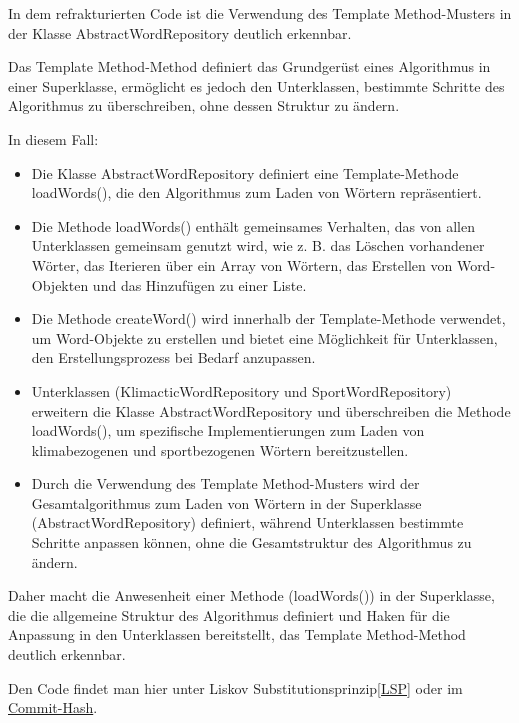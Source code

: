In dem refrakturierten Code ist die Verwendung des Template Method-Musters in der Klasse AbstractWordRepository deutlich erkennbar.

Das Template Method-Method definiert das Grundgerüst eines Algorithmus in einer Superklasse, ermöglicht es jedoch den Unterklassen, bestimmte Schritte des Algorithmus zu überschreiben, ohne dessen Struktur zu ändern.

In diesem Fall:
\begin{itemize}
    \item Die Klasse AbstractWordRepository definiert eine Template-Methode loadWords(), die den Algorithmus zum Laden von Wörtern repräsentiert.
    \item Die Methode loadWords() enthält gemeinsames Verhalten, das von allen Unterklassen gemeinsam genutzt wird, wie z. B. das Löschen vorhandener Wörter, das Iterieren über ein Array von Wörtern, das Erstellen von Word-Objekten und das Hinzufügen zu einer Liste.
    \item Die Methode createWord() wird innerhalb der Template-Methode verwendet, um Word-Objekte zu erstellen und bietet eine Möglichkeit für Unterklassen, den Erstellungsprozess bei Bedarf anzupassen.
    \item Unterklassen (KlimacticWordRepository und SportWordRepository) erweitern die Klasse AbstractWordRepository und überschreiben die Methode loadWords(), um spezifische Implementierungen zum Laden von klimabezogenen und sportbezogenen Wörtern bereitzustellen.
    \item Durch die Verwendung des Template Method-Musters wird der Gesamtalgorithmus zum Laden von Wörtern in der Superklasse (AbstractWordRepository) definiert, während Unterklassen bestimmte Schritte anpassen können, ohne die Gesamtstruktur des Algorithmus zu ändern.
\end{itemize}
    
Daher macht die Anwesenheit einer Methode (loadWords()) in der Superklasse, die die allgemeine Struktur des Algorithmus definiert und Haken für die Anpassung in den Unterklassen bereitstellt, das Template Method-Method deutlich erkennbar.

Den Code findet man hier unter Liskov Substitutionsprinzip\ref{LSP} oder im \href{https://github.com/lorenz1702/Spy-Game/commit/e3fef4ffb48a3b35e6825ff9a1084a08438eeed2}{Commit-Hash}.




